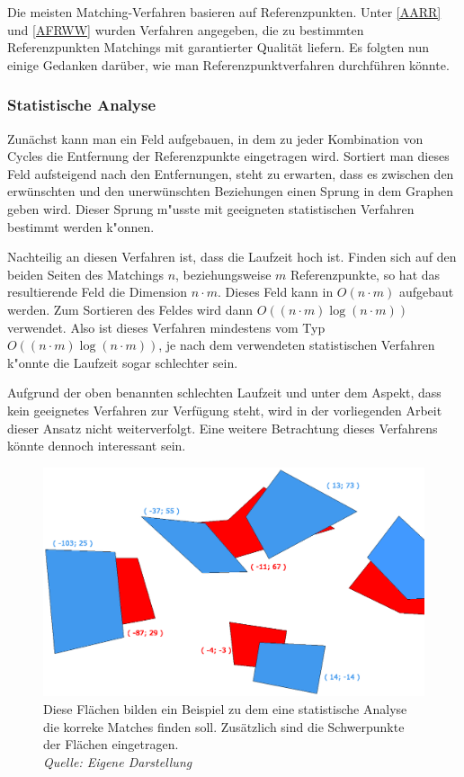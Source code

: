 Die meisten Matching-Verfahren basieren auf Referenzpunkten. Unter \vref{AARR} und \vref{AFRWW} wurden Verfahren angegeben, die zu bestimmten Referenzpunkten Matchings mit garantierter Qualität liefern. Es folgten nun einige Gedanken darüber, wie man Referenzpunktverfahren durchführen könnte.


\subsubsection*{Statistische Analyse}\label{StatistikAlgo}

Zunächst kann man ein Feld aufgebauen, in dem zu jeder Kombination von Cycles die Entfernung der Referenzpunkte eingetragen wird. Sortiert man dieses Feld aufsteigend nach den Entfernungen, steht zu erwarten, dass es zwischen den erwünschten und den unerwünschten Beziehungen einen Sprung in dem Graphen geben wird.  Dieser Sprung m"usste mit geeigneten statistischen Verfahren bestimmt werden k"onnen. 

Nachteilig an diesen Verfahren ist, dass die Laufzeit hoch ist. Finden sich auf den beiden Seiten des Matchings $n$, beziehungsweise $m$ Referenzpunkte, so hat das resultierende Feld die Dimension $n\cdot m$. Dieses Feld kann in $O(n\cdot m)$ aufgebaut werden. Zum Sortieren des Feldes wird dann $O((n\cdot m)\log(n\cdot m))$ verwendet. Also ist dieses Verfahren mindestens vom Typ $O((n\cdot m)\log(n\cdot m))$, je nach dem verwendeten statistischen Verfahren k"onnte die Laufzeit sogar schlechter sein.

Aufgrund der oben benannten schlechten Laufzeit und unter dem Aspekt, dass kein geeignetes Verfahren zur Verfügung steht, wird in der vorliegenden Arbeit dieser Ansatz nicht weiterverfolgt. Eine weitere Betrachtung dieses Verfahrens könnte dennoch interessant sein.

\begin{figure}
	\centering
	\includegraphics[scale=0.65]{Statistik.eps}
	\caption[Flächen als Beispiel einer statistischen Analyse]{Diese Flächen bilden ein Beispiel zu dem eine statistische Analyse die korreke Matches finden soll. Zusätzlich sind die Schwerpunkte der Flächen eingetragen. \\\textit{Quelle: Eigene Darstellung}}
	\label{fig:StatistikFla}
\end{figure}


